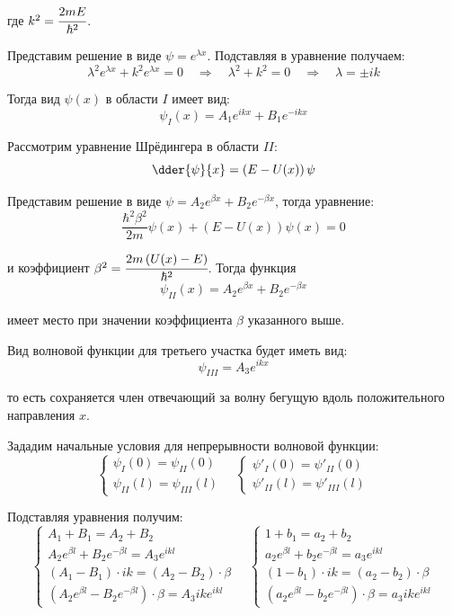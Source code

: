 где \( k^2 = \cfrac{2mE}{\hbar^2} \).

Представим решение в виде \( \psi = e^{\lambda x} \). Подставляя в уравнение 
получаем:
\[ 
	\lambda^2 e^{\lambda x} + k^2 e^{\lambda x} = 0 \quad\Rightarrow\quad
	\lambda^2 + k^2 = 0 \quad\Rightarrow\quad \lambda = \pm ik 
\]

Тогда вид \( \psi(x) \) в области \( I \) имеет вид:
\[
	\psi_{I}(x) = A_1 e^{ikx} + B_1 e^{-ikx}
\]

Рассмотрим уравнение Шрёдингера в области \( II \):
\[
	\dder{\psi}{x} = \left( E - U(x) \right)\psi
\]

Представим решение в виде \( \psi = A_2 e^{\beta x} + B_2 e^{-\beta x} \), 
тогда уравнение:
\[
	\frac{\hbar^2 \beta^2}{2m}\psi(x) + \left( E - U(x) \right)\psi(x) = 0
\]

и коэффициент \( \beta^2 = \cfrac{2m\left( U(x) - E\right)}{\hbar^2} \). 
Тогда функция 
\[
	\psi_{II}(x) = A_2 e^{\beta x} + B_2 e^{-\beta x}
\]

имеет место при значении коэффициента \( \beta \) указанного выше.

Вид волновой функции для третьего участка будет иметь вид:
\[
	\psi_{III} = A_3 e^{ikx}
\]

то есть сохраняется член отвечающий за волну бегущую вдоль
положительного направления \( x \).

Зададим начальные условия для непрерывности волновой функции:
\[
	\left\{ \begin{array}{ll}
		\psi_{I}(0) = \psi_{II}(0) \\
		\psi_{II}(l) = \psi_{III}(l)
	\end{array} \right. \quad
	\left\{ \begin{array}{ll}
		\psi'_{I}(0) = \psi'_{II}(0) \\
		\psi'_{II}(l) = \psi'_{III}(l)
	\end{array} \right.
\]

Подставляя уравнения получим:
\[
	\left\{ \begin{array}{ll}
		A_1 + B_1 = A_2 + B_2 \\
		A_2 e^{\beta l} + B_2 e^{-\beta l} = A_3 e^{ikl} \\
		\left( A_1 - B_1 \right) \cdot ik = 
			\left( A_2 - B_2 \right) \cdot \beta \\
		\left( A_2 e^{\beta l} - B_2 e^{-\beta l} \right) \cdot \beta = 
			A_3 ik e^{ikl}
	\end{array} \right. \quad
	\left\{ \begin{array}{ll}
		1 + b_1 = a_2 + b_2 \\
		a_2 e^{\beta l} + b_2 e^{-\beta l} = a_3 e^{ikl} \\
		\left( 1 - b_1 \right) \cdot ik = 
			\left( a_2 - b_2 \right) \cdot \beta \\
		\left( a_2 e^{\beta l} - b_2 e^{-\beta l} \right) \cdot \beta = 
			a_3 ik e^{ikl}
	\end{array} \right.
\]

